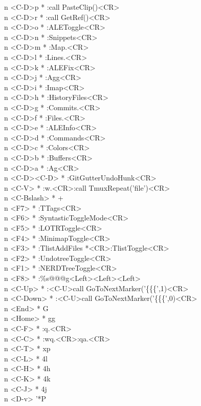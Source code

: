 \documentclass[11pt,a4paper,twoside]{book}
\begin{document}
n  <C-D>p  * :call PasteClip()<CR>\\
n  <C-D>r  * :call GetRef()<CR>\\
n  <C-D>o  * :ALEToggle<CR>\\
n  <C-D>n  * :Snippets<CR>\\
n  <C-D>m  * :Map.<CR>\\
n  <C-D>l  * :Lines.<CR>\\
n  <C-D>k  * :ALEFix<CR>\\
n  <C-D>j  * :Agg<CR>\\
n  <C-D>i  * :Imap<CR>\\
n  <C-D>h  * :HistoryFiles<CR>\\
n  <C-D>g  * :Commits.<CR>\\
n  <C-D>f  * :Files.<CR>\\
n  <C-D>e  * :ALEInfo<CR>\\
n  <C-D>d  * :Commands<CR>\\
n  <C-D>c  * :Colors<CR>\\
n  <C-D>b  * :Buffers<CR>\\
n  <C-D>a  * :Ag<CR>\\
n  <C-D><C-D>  * :GitGutterUndoHunk<CR>\\
n  <C-V>  * :w.<CR>:call TmuxRepeat('file')<CR>\\
n  <C-Bslash>  * +\\
n  <F7>  * :TTags<CR>\\
n  <F6>  * :SyntasticToggleMode<CR>\\
n  <F5>  * :LOTRToggle<CR>\\
n  <F4>  * :MinimapToggle<CR>\\
n  <F3>  * :TlistAddFiles *<CR>:TlistToggle<CR>\\
n  <F2>  * :UndotreeToggle<CR>\\
n  <F1>  * :NERDTreeToggle<CR>\\
n  <F8>  * :\%s@@@g<Left><Left><Left>\\
n  <C-Up>  * :<C-U>call GoToNextMarker('\{\{\{',1)<CR>\\
n  <C-Down>  * :<C-U>call GoToNextMarker('\{\{\{',0)<CR>\\
n  <End>  * G\\
n  <Home>  * gg\\
n  <C-F>  * :q.<CR>\\
n  <C-C>  * :wq.<CR>:qa.<CR>\\
n  <C-T>  * xp\\
n  <C-L>  * 4l\\
n  <C-H>  * 4h\\
n  <C-K>  * 4k\\
n  <C-J>  * 4j\\
n  <D-v>  '*P\\
\end{document}
